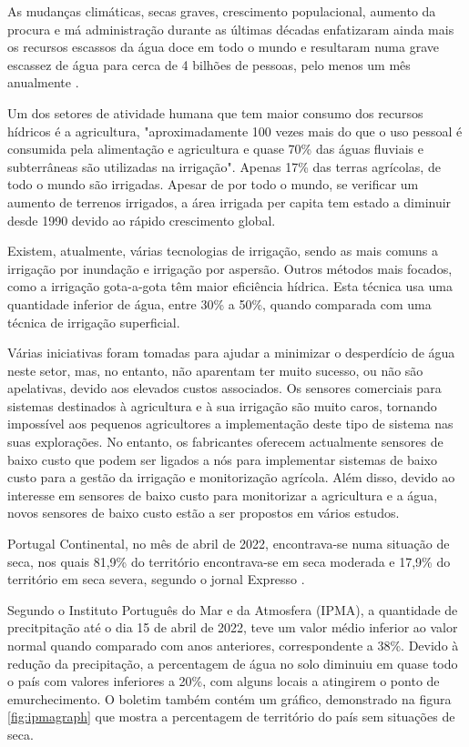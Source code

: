 \documentclass[conference]{IEEEtran}
\begin{document}
As mudanças climáticas, secas graves, crescimento populacional, aumento da 
procura e má administração durante as últimas décadas enfatizaram ainda mais 
os recursos escassos da água doce em todo o mundo e resultaram numa grave 
escassez de água para cerca de 4 bilhões de pessoas, pelo menos um mês 
anualmente \cite{jafari2018assessing} \cite{unicef2019progress} \cite{orimoloye2021spatial}. \cite{salehi2022global}

Um dos setores de atividade humana que tem maior consumo dos recursos hídricos 
é a agricultura, "aproximadamente 100 vezes mais do que o uso pessoal é consumida 
pela alimentação e agricultura e quase 70\% das águas fluviais e subterrâneas 
são utilizadas na irrigação". \cite{nawandar2019iot} Apenas 17\% das terras 
agrícolas, de todo o mundo são irrigadas. Apesar de por todo o mundo, se verificar 
um aumento de terrenos irrigados, a área irrigada per capita tem estado a diminuir 
desde 1990 devido ao rápido crescimento global. \cite{pimentelwater}

Existem, atualmente, várias tecnologias de irrigação, sendo as mais comuns 
a irrigação por inundação e irrigação por aspersão. Outros métodos mais 
focados, como a irrigação gota-a-gota têm maior eficiência hídrica. Esta 
técnica usa uma quantidade inferior de água, entre 30\% a 50\%, quando 
comparada com uma técnica de irrigação superficial. \cite{pimentelwater}

Várias iniciativas foram tomadas para ajudar a minimizar o desperdício 
de água neste setor, mas, no entanto, não aparentam ter muito sucesso, 
ou não são apelativas, devido aos elevados custos associados. 
Os sensores comerciais para sistemas destinados à agricultura e à sua 
irrigação são muito caros, tornando impossível aos pequenos agricultores 
a implementação deste tipo de sistema nas suas explorações. No entanto, 
os fabricantes oferecem actualmente sensores de baixo custo que podem 
ser ligados a nós para implementar sistemas de baixo custo para a gestão da 
irrigação e monitorização agrícola. Além disso, devido ao interesse em 
sensores de baixo custo para monitorizar a agricultura e a água, 
novos sensores de baixo custo estão a ser propostos em vários estudos. \cite{garcia2020iot}

Portugal Continental, no mês de abril de 2022, encontrava-se numa situação de seca, nos 
quais 81,9\% do território encontrava-se em seca moderada e 17,9\% do território em seca severa, 
segundo o jornal Expresso \cite{expresso}. 

Segundo o Instituto Português do Mar e da Atmosfera (IPMA), 
a quantidade de precitpitação até o dia 15 de abril de 2022, teve um valor médio inferior ao valor normal 
quando comparado com anos anteriores, correspondente a 38\%. Devido à redução da precipitação, 
a percentagem de água no solo diminuiu em quase todo o país com valores inferiores a 20\%, com alguns locais 
a atingirem o ponto de emurchecimento. O boletim também contém um gráfico, demonstrado na figura \ref{fig:ipmagraph} 
que mostra a percentagem de território do país sem situações de seca. \cite{ipmaboletim}
\end{document}

